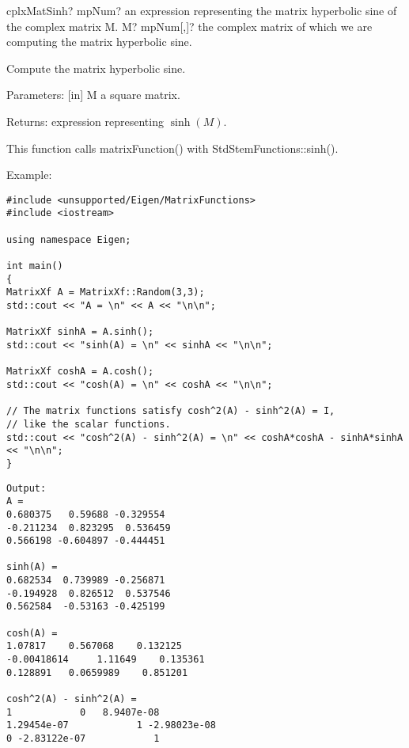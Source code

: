 \vspace{0.6cm}
\begin{mpFunctionsExtract}
	\mpFunctionOne
	{cplxMatSinh? mpNum? an expression representing the matrix hyperbolic sine of the complex matrix M.}
	{M? mpNum[,]? the complex matrix of which we are computing the matrix hyperbolic sine.}
\end{mpFunctionsExtract}

%

\vspace{0.3cm}
Compute the matrix hyperbolic sine.

Parameters:
[in] M a square matrix.  

Returns:
expression representing $\sinh(M)$.

This function calls matrixFunction() with StdStemFunctions::sinh().

Example:

\begin{lstlisting}
#include <unsupported/Eigen/MatrixFunctions>
#include <iostream>

using namespace Eigen;

int main()
{
MatrixXf A = MatrixXf::Random(3,3);
std::cout << "A = \n" << A << "\n\n";

MatrixXf sinhA = A.sinh();
std::cout << "sinh(A) = \n" << sinhA << "\n\n";

MatrixXf coshA = A.cosh();
std::cout << "cosh(A) = \n" << coshA << "\n\n";

// The matrix functions satisfy cosh^2(A) - sinh^2(A) = I,
// like the scalar functions.
std::cout << "cosh^2(A) - sinh^2(A) = \n" << coshA*coshA - sinhA*sinhA 
<< "\n\n";
}
\end{lstlisting}

\begin{verbatim}
Output:
A = 
0.680375   0.59688 -0.329554
-0.211234  0.823295  0.536459
0.566198 -0.604897 -0.444451

sinh(A) = 
0.682534  0.739989 -0.256871
-0.194928  0.826512  0.537546
0.562584  -0.53163 -0.425199

cosh(A) = 
1.07817    0.567068    0.132125
-0.00418614     1.11649    0.135361
0.128891   0.0659989    0.851201

cosh^2(A) - sinh^2(A) = 
1            0   8.9407e-08
1.29454e-07            1 -2.98023e-08
0 -2.83122e-07            1

\end{verbatim}




